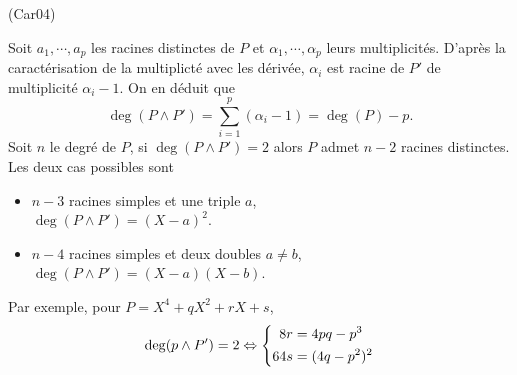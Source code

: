 \begin{tiny}(Car04)\end{tiny} Soit $a_1, \cdots, a_p$ les racines distinctes de  $P$ et $\alpha_1, \cdots , \alpha_p$ leurs multiplicités. D'après la caractérisation de la multiplicté avec les dérivée, $\alpha_i$ est racine de $P'$ de multiplicité $\alpha_i - 1$. On en déduit que 
\[
 \deg(P \wedge P') = \sum_{i=1}^p(\alpha_i - 1) = \deg(P) - p.
\]
Soit $n$ le degré de $P$, si $\deg( P \wedge P') = 2$ alors $P$ admet $n-2$ racines distinctes. Les deux cas possibles sont
\begin{itemize}
 \item $n-3$ racines simples et une triple $a$,\\ $\deg( P \wedge P') = (X-a)^2$.
 \item $n-4$ racines simples et deux doubles $a \neq b$,\\ $\deg( P \wedge P') = (X-a)(X-b)$.
\end{itemize}
Par exemple, pour $P = X^4 + qX^2 + rX +s$, 
\[
 \deg(p \wedge P') = 2 \\
 \Leftrightarrow
 \left\lbrace 
 \begin{aligned}
  8r &= 4pq - p^3 \\ 64 s &= (4q - p^2)^2
 \end{aligned}
\right. 
\]

 
